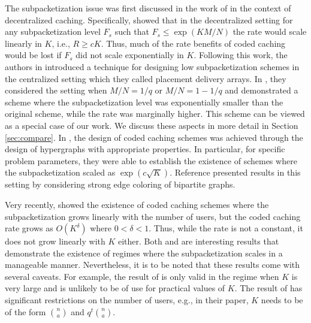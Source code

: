\documentclass[journal,twocolumn]{IEEEtran}
\theoremstyle{definition}
\newcommand{\aditya}[1]{\marginpar{+}{\bf Aditya's remark}: {\em #1}}
\newcommand{\litang}[1]{\marginpar{+}{\bf Li's remark}: {\em #1}}
\begin{document}
The subpacketization issue was first discussed in the work of \cite{shanmugam_et_al14, shanmugam_et_al16} in the context of decentralized caching. Specifically, \cite{shanmugam_et_al16} showed that in the decentralized setting for any subpacketization level $F_s$ such that $F_s \leq \exp (KM/N)$ the rate would scale linearly in $K$, i.e., $R \geq cK$. Thus, much of the rate benefits of coded caching would be lost if $F_s$ did not scale exponentially in $K$. Following this work, the authors in \cite{yan_et_al17} introduced a technique for designing low subpacketization schemes in the centralized setting which they called placement delivery arrays. In \cite{yan_et_al17}, they considered the setting when $M/N = 1/q$ or $M/N = 1 - 1/q$ and demonstrated a scheme where the subpacketization level was exponentially smaller than the original scheme, while the rate was marginally higher. This scheme can be viewed as a special case of our work. We discuss these aspects in more detail in Section \ref{sec:compare}. In \cite{shangguan2016centralized}, the design of coded caching schemes was achieved through the design of hypergraphs with appropriate properties. In particular, for specific problem parameters, they were able to establish the existence of schemes where the subpacketization scaled as $\exp (c \sqrt{K})$. Reference\cite{yan2016placement} presented results in this setting by considering strong edge coloring of bipartite graphs.

Very recently, \cite{shanmugam2017coded} showed the existence of coded caching schemes where the subpacketization grows linearly with the number of users, but the coded caching rate grows as $O(K^\delta)$ where $0 < \delta < 1$. Thus, while the rate is not a constant, it does not grow linearly with $K$ either. Both \cite{shangguan2016centralized} and \cite{shanmugam2017coded} are interesting results that demonstrate the existence of regimes where the subpacketization scales in a manageable manner. Nevertheless, it is to be noted that these results come with several caveats. For example, the result of \cite{shanmugam2017coded} is only valid in the regime when $K$ is very large and is unlikely to be of use for practical values of $K$. The result of \cite{shangguan2016centralized} has significant restrictions on the number of users, e.g., in their paper, $K$ needs to be of the form $\binom{n}{a}$ and $q^t\binom{n}{a}$.%
\end{document}
